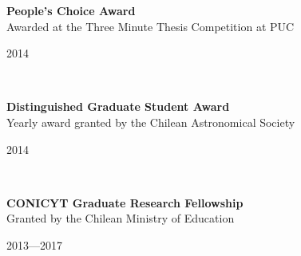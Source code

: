 \documentclass[11pt, a4paper]{article} %
\begin{document}
\begin{minipage}[t]{0.7\textwidth}
\begin{flushleft}%
  \setlength{\leftskip}{0.2cm}%
\textbf{People's Choice Award}\\
 Awarded at the Three Minute Thesis\textsuperscript{\textregistered} Competition at PUC
 \end{flushleft}
\end{minipage}
\begin{minipage}[t]{0.3\textwidth}
\hfill 2014
\end{minipage}\\

\begin{minipage}[t]{0.7\textwidth}
\begin{flushleft}%
  \setlength{\leftskip}{0.2cm}%
\textbf{Distinguished Graduate Student Award}\\
 Yearly award granted by the Chilean Astronomical Society
 \end{flushleft}
\end{minipage}
\begin{minipage}[t]{0.3\textwidth}
\hfill 2014
\end{minipage}\\

\begin{minipage}[t]{0.7\textwidth}
\begin{flushleft}%
  \setlength{\leftskip}{0.2cm}%
\textbf{CONICYT Graduate Research Fellowship}\\
Granted by the Chilean Ministry of Education
\end{flushleft}
\end{minipage}
\begin{minipage}[t]{0.3\textwidth}
\hfill 2013---2017
\end{minipage}
\end{document}
